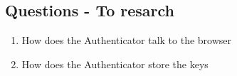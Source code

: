 

\subsection{Questions - To resarch}

\begin{enumerate}
	\item How does the Authenticator talk to the browser
	\item How does the Authenticator store the keys
\end{enumerate}